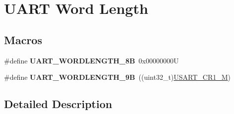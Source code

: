\hypertarget{group___u_a_r_t___word___length}{}\section{U\+A\+RT Word Length}
\label{group___u_a_r_t___word___length}
\subsection*{Macros}
\begin{DoxyCompactItemize}
\item 
\mbox{\label{group___u_a_r_t___word___length_gaf394e9abaf17932ee89591f990fe6407}} 
\#define {\bfseries U\+A\+R\+T\+\_\+\+W\+O\+R\+D\+L\+E\+N\+G\+T\+H\+\_\+8B}~0x00000000U
\item 
\mbox{\label{group___u_a_r_t___word___length_gaf867be43de35fd3c32fe0b4dd4058f7e}} 
\#define {\bfseries U\+A\+R\+T\+\_\+\+W\+O\+R\+D\+L\+E\+N\+G\+T\+H\+\_\+9B}~((uint32\+\_\+t)\mbox{\hyperlink{group___peripheral___registers___bits___definition_ga95f0288b9c6aaeca7cb6550a2e6833e2}{U\+S\+A\+R\+T\+\_\+\+C\+R1\+\_\+M}})
\end{DoxyCompactItemize}


\subsection{Detailed Description}
